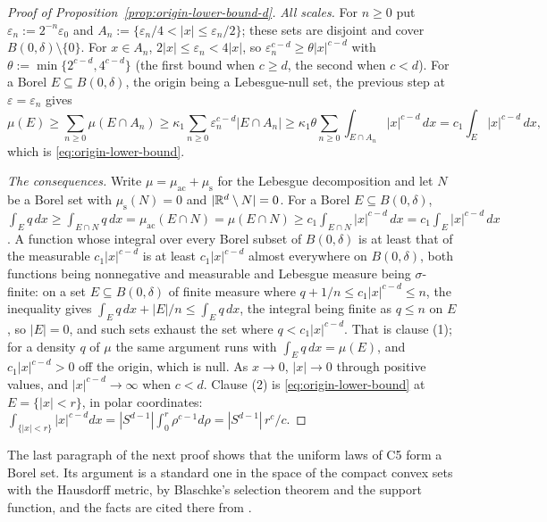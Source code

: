\begin{proof}[Proof of Proposition~\ref{prop:origin-lower-bound-d}]
\emph{All scales.} For $n \ge 0$ put $\varepsilon_n := 2^{-n}\varepsilon_0$ and
$A_n := \{\varepsilon_n/4 < |x| \le \varepsilon_n/2\}$; these sets are disjoint and cover
$B(0,\delta)\setminus\{0\}$. For $x \in A_n$, $2|x| \le \varepsilon_n < 4|x|$, so
$\varepsilon_n^{c-d} \ge \theta|x|^{c-d}$ with $\theta := \min\{2^{c-d},4^{c-d}\}$ (the first bound
when $c \ge d$, the second when $c < d$). For a Borel $E \subseteq B(0,\delta)$, the origin being a
Lebesgue-null set, the previous step at $\varepsilon = \varepsilon_n$ gives
\[
  \mu(E) \ge \sum_{n\ge0}\mu(E \cap A_n)
   \ge \kappa_1\sum_{n\ge0}\varepsilon_n^{c-d}|E \cap A_n|
   \ge \kappa_1\theta\sum_{n\ge0}\int_{E\cap A_n}|x|^{c-d}\,dx
   = c_1\int_E|x|^{c-d}\,dx ,
\]
which is \ref{eq:origin-lower-bound}.

\emph{The consequences.} Write $\mu = \mu_{\mathrm{ac}} + \mu_{\mathrm s}$ for the Lebesgue
decomposition and let $N$ be a Borel set with $\mu_{\mathrm s}(N) = 0$ and
$|\mathbb{R}^d \setminus N| = 0$. For a Borel $E \subseteq B(0,\delta)$,
$\int_E q\,dx \ge \int_{E\cap N} q\,dx = \mu_{\mathrm{ac}}(E \cap N) = \mu(E \cap N)
\ge c_1\int_{E\cap N}|x|^{c-d}\,dx = c_1\int_E|x|^{c-d}\,dx$. A function whose integral over every
Borel subset of $B(0,\delta)$ is at least that of the measurable $c_1|x|^{c-d}$ is at least
$c_1|x|^{c-d}$ almost everywhere on $B(0,\delta)$, both functions being nonnegative and measurable
and Lebesgue measure being $\sigma$-finite: on a set $E \subseteq B(0,\delta)$ of finite measure
where $q + 1/n \le c_1|x|^{c-d} \le n$, the inequality gives
$\int_E q\,dx + |E|/n \le \int_E q\,dx$, the integral being finite as $q \le n$ on $E$, so $|E| = 0$, and such sets exhaust the set
where $q < c_1|x|^{c-d}$. That is clause (1); for a density $q$ of $\mu$ the
same argument runs with $\int_E q\,dx = \mu(E)$, and $c_1|x|^{c-d} > 0$ off the origin, which is
null. As $x \to 0$, $|x| \to 0$ through positive values, and $|x|^{c-d} \to \infty$ when $c < d$.
Clause (2) is \ref{eq:origin-lower-bound} at $E = \{|x| < r\}$, in polar coordinates:
$\int_{\{|x|<r\}}|x|^{c-d}dx = |S^{d-1}|\int_0^r\rho^{c-1}d\rho = |S^{d-1}|\,r^c/c$.
\end{proof}

The last paragraph of the next proof shows that the uniform laws of C5 form a Borel set. Its
argument is a standard one in the space of the compact convex sets with the Hausdorff metric, by
Blaschke's selection theorem and the support function, and the facts are cited there from
.

